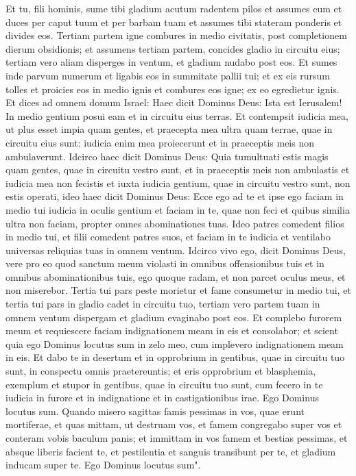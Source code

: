 \begin{biblechapter}  
\verse Et tu, fili hominis, sume tibi gladium acutum radentem pilos et assumes eum et duces per caput tuum et per barbam tuam et assumes tibi stateram ponderis et divides eos. 
\verse Tertiam partem igne combures in medio civitatis, post completionem dierum obsidionis; et assumens tertiam partem, concides gladio in circuitu eius; tertiam vero aliam disperges in ventum, et gladium nudabo post eos. 
\verse Et sumes inde parvum numerum et ligabis eos in summitate pallii tui;  
\verse et ex eis rursum tolles et proicies eos in medio ignis et combures eos igne; ex eo egredietur ignis. Et dices ad omnem domum Israel: 
\verse Haec dicit Dominus Deus: Ista est Ierusalem! In medio gentium posui eam et in circuitu eius terras. 
\verse Et contempsit iudicia mea, ut plus esset impia quam gentes, et praecepta mea ultra quam terrae, quae in circuitu eius sunt: iudicia enim mea proiecerunt et in praeceptis meis non ambulaverunt. 
\verse Idcirco haec dicit Dominus Deus: Quia tumultuati estis magis quam gentes, quae in circuitu vestro sunt, et in praeceptis meis non ambulastis et iudicia mea non fecistis et iuxta iudicia gentium, quae in circuitu vestro sunt, non estis operati, 
\verse ideo haec dicit Dominus Deus: Ecce ego ad te et ipse ego faciam in medio tui iudicia in oculis gentium 
\verse et faciam in te, quae non feci et quibus similia ultra non faciam, propter omnes abominationes tuas. 
\verse Ideo patres comedent filios in medio tui, et filii comedent patres suos, et faciam in te iudicia et ventilabo universas reliquias tuas in omnem ventum. 
\verse Idcirco vivo ego, dicit Dominus Deus, vere pro eo quod sanctum meum violasti in omnibus offensionibus tuis et in omnibus abominationibus tuis, ego quoque radam, et non parcet oculus meus, et non miserebor. 
\verse Tertia tui pars peste morietur et fame consumetur in medio tui, et tertia tui pars in gladio cadet in circuitu tuo, tertiam vero partem tuam in omnem ventum dispergam et gladium evaginabo post eos. 
\verse Et complebo furorem meum et requiescere faciam indignationem meam in eis et consolabor; et scient quia ego Dominus locutus sum in zelo meo, cum implevero indignationem meam in eis. 
\verse Et dabo te in desertum et in opprobrium in gentibus, quae in circuitu tuo sunt, in conspectu omnis praetereuntis; 
\verse et eris opprobrium et blasphemia, exemplum et stupor in gentibus, quae in circuitu tuo sunt, cum fecero in te iudicia in furore et in indignatione et in castigationibus irae. 
\verse Ego Dominus locutus sum. Quando misero sagittas famis pessimas in vos, quae erunt mortiferae, et quas mittam, ut destruam vos, et famem congregabo super vos et conteram vobis baculum panis;  
\verse et immittam in vos famem et bestias pessimas, et absque liberis facient te, et pestilentia et sanguis transibunt per te, et gladium inducam super te. Ego Dominus locutus sum". 
\end{biblechapter}

